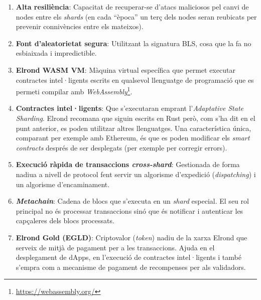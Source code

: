 \documentclass[11pt,a4paper]{article}
\begin{document}
\begin{enumerate}
  \item \textbf{Alta resiliència}: Capacitat de recuperar-se d'atacs maliciosos pel canvi de nodes entre els \textit{shards} (en cada ``època'' un terç dels nodes seran reubicats per prevenir connivències entre els mateixos).
  \item \textbf{Font d'aleatorietat segura}: Utilitzant la signatura BLS, cosa que la fa no esbiaixada i impredictible.
  \item \textbf{Elrond WASM VM}: Màquina virtual específica que permet executar contractes intel·ligents escrits en qualsevol llenguatge de programació que es permeti compilar amb  \textit{WebAssembly}\footnote{\url{https://webassembly.org/}}.
  \item \textbf{Contractes intel·ligents}: Que s'executaran emprant l'\textit{Adaptative State Sharding}. Elrond recomana que siguin escrits en Rust però, com s'ha dit en el punt anterior, es poden utilitzar altres llenguatges. Una característica única, comparant per exemple amb Ethereum, és que es poden modificar els \textit{smart contracts} després de ser desplegats \cite{cwirko01} (per exemple per corregir errors).
  \item \textbf{Execució ràpida de transaccions \textit{cross-shard}}: Gestionada de forma nadiua a nivell de protocol fent servir un algorisme d'expedició (\textit{dispatching}) i un algorisme d'encaminament.
   \item \textbf{\textit{Metachain}}: Cadena de blocs que s'executa en un \textit{shard} especial. El seu rol principal no és processar transaccions sinó que  és notificar i autenticar les capçaleres dels blocs processats.
   \item \textbf{Elrond Gold (EGLD)}: Criptovalor (\textit{token}) nadiu de la xarxa Elrond que serveix de mitjà de pagament per a les transaccions. Ajuda en el desplegament de dApps, en l'execució de contractes intel·ligents i també s'empra com a mecanisme de pagament de recompenses per als validadors. 
\end{enumerate}
\end{document}
